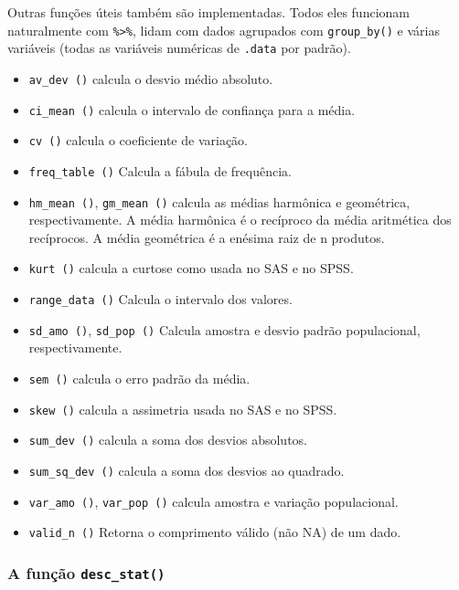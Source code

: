 \documentclass[
]{book}
\providecommand{\tightlist}{%
  \setlength{\itemsep}{0pt}\setlength{\parskip}{0pt}}
\begin{document}
Outras funções úteis também são implementadas. Todos eles funcionam naturalmente com \texttt{\%\textgreater{}\%}, lidam com dados agrupados com \texttt{group\_by()} e várias variáveis (todas as variáveis numéricas de \texttt{.data} por padrão).

\begin{itemize}
\tightlist
\item
  \texttt{av\_dev\ ()} calcula o desvio médio absoluto.
\item
  \texttt{ci\_mean\ ()} calcula o intervalo de confiança para a média.
\item
  \texttt{cv\ ()} calcula o coeficiente de variação.
\item
  \texttt{freq\_table\ ()} Calcula a fábula de frequência.
\item
  \texttt{hm\_mean\ ()}, \texttt{gm\_mean\ ()} calcula as médias harmônica e geométrica, respectivamente. A média harmônica é o recíproco da média aritmética dos recíprocos. A média geométrica é a enésima raiz de n produtos.
\item
  \texttt{kurt\ ()} calcula a curtose como usada no SAS e no SPSS.
\item
  \texttt{range\_data\ ()} Calcula o intervalo dos valores.
\item
  \texttt{sd\_amo\ ()}, \texttt{sd\_pop\ ()} Calcula amostra e desvio padrão populacional, respectivamente.
\item
  \texttt{sem\ ()} calcula o erro padrão da média.
\item
  \texttt{skew\ ()} calcula a assimetria usada no SAS e no SPSS.
\item
  \texttt{sum\_dev\ ()} calcula a soma dos desvios absolutos.
\item
  \texttt{sum\_sq\_dev\ ()} calcula a soma dos desvios ao quadrado.
\item
  \texttt{var\_amo\ ()}, \texttt{var\_pop\ ()} calcula amostra e variação populacional.
\item
  \texttt{valid\_n\ ()} Retorna o comprimento válido (não NA) de um dado.
\end{itemize}

\hypertarget{a-funuxe7uxe3o-desc_stat}{%
\subsubsection{\texorpdfstring{A função \texttt{desc\_stat()}}{A função desc\_stat()}}\label{a-funuxe7uxe3o-desc_stat}}
\end{document}

